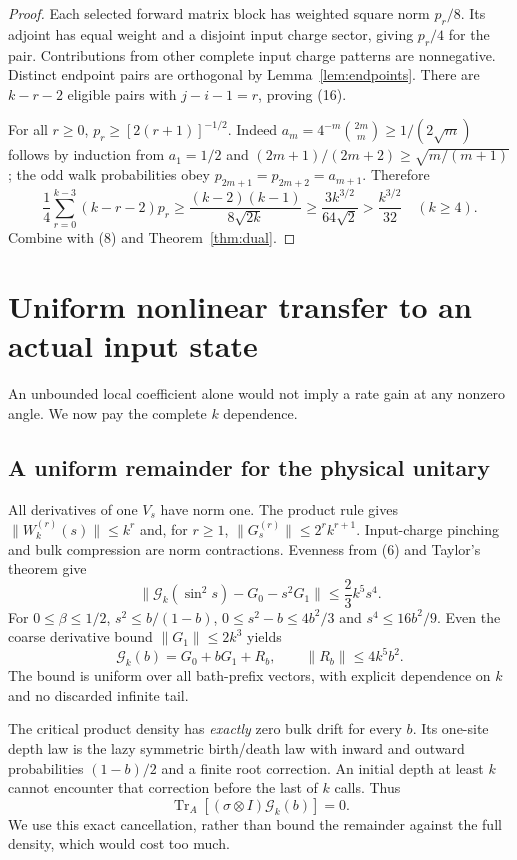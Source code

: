 \documentclass[11pt]{article}
\newcommand{\Tr}{\operatorname{Tr}}
\newcommand{\norm}[1]{\lVert #1\rVert}
\begin{document}
\begin{proof}
Each selected forward matrix block has weighted square norm
$p_r/8$. Its adjoint has equal weight and a disjoint input charge
sector, giving $p_r/4$ for the pair. Contributions from other complete
input charge patterns are nonnegative. Distinct endpoint pairs are
orthogonal by Lemma~\ref{lem:endpoints}. There are $k-r-2$ eligible
pairs with $j-i-1=r$, proving (16).

For all $r\ge0$, $p_r\ge[2(r+1)]^{-1/2}$. Indeed
$a_m=4^{-m}\binom{2m}m\ge1/(2\sqrt m)$ follows by induction from
$a_1=1/2$ and
$(2m+1)/(2m+2)\ge\sqrt{m/(m+1)}$; the odd walk probabilities obey
$p_{2m+1}=p_{2m+2}=a_{m+1}$. Therefore
\[
 \frac14\sum_{r=0}^{k-3}(k-r-2)p_r
 \ge\frac{(k-2)(k-1)}{8\sqrt{2k}}
 \ge\frac{3k^{3/2}}{64\sqrt2}>\frac{k^{3/2}}{32}
 \quad(k\ge4).
\]
Combine with (8) and Theorem~\ref{thm:dual}.
\end{proof}

\section{Uniform nonlinear transfer to an actual input state}

An unbounded local coefficient alone would not imply a rate gain at
any nonzero angle. We now pay the complete $k$ dependence.

\subsection{A uniform remainder for the physical unitary}

All derivatives of one $V_s$ have norm one. The product rule gives
$\norm{W_k^{(r)}(s)}\le k^r$ and, for $r\ge1$,
$\norm{G_s^{(r)}}\le2^rk^{r+1}$. Input-charge pinching and bulk
compression are norm contractions. Evenness from (6) and Taylor's
theorem give
\[
 \norm{\mathcal G_k(\sin^2s)-G_0-s^2G_1}
 \le\frac23k^5s^4.
\]
For $0\le\beta\le1/2$,
$s^2\le b/(1-b)$, $0\le s^2-b\le4b^2/3$ and
$s^4\le16b^2/9$. Even the coarse derivative bound
$\norm{G_1}\le2k^3$ yields
\[
 \mathcal G_k(b)=G_0+bG_1+R_b,\qquad
 \norm{R_b}\le4k^5b^2.
 \tag{20}
\]
The bound is uniform over all bath-prefix vectors, with explicit
dependence on $k$ and no discarded infinite tail.

The critical product density has \emph{exactly} zero bulk drift for
every $b$. Its one-site depth law is the lazy symmetric birth/death law
with inward and outward probabilities $(1-b)/2$ and a finite root
correction. An initial depth at least $k$ cannot encounter that
correction before the last of $k$ calls. Thus
\[
 \Tr_A[(\sigma\otimes I)\mathcal G_k(b)]=0.
 \tag{21}
\]
We use this exact cancellation, rather than bound the remainder against
the full density, which would cost too much.
\end{document}
